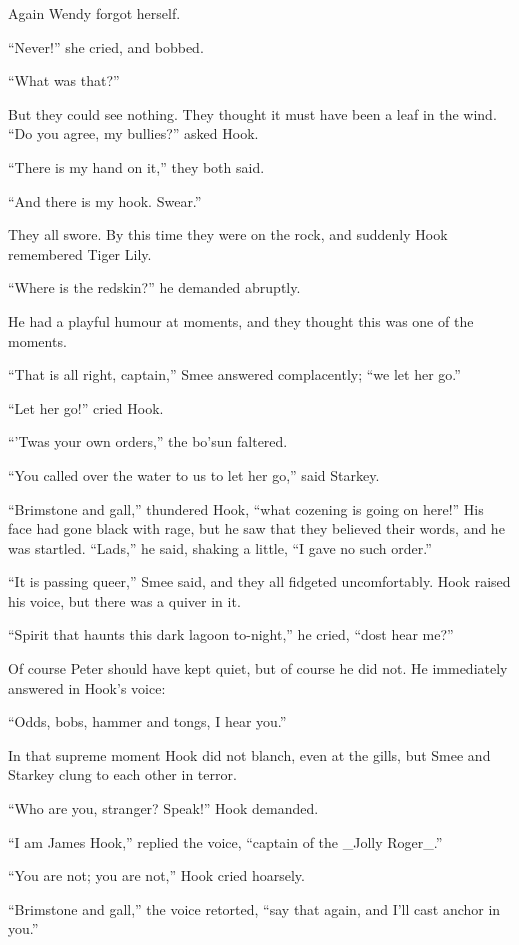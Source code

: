 Again Wendy forgot herself.

``Never!'' she cried, and bobbed.

``What was that?''

But they could see nothing. They thought it must have been a leaf in
the wind. ``Do you agree, my bullies?'' asked Hook.

``There is my hand on it,'' they both said.

``And there is my hook. Swear.''

They all swore. By this time they were on the rock, and suddenly Hook
remembered Tiger Lily.

``Where is the redskin?'' he demanded abruptly.

He had a playful humour at moments, and they thought this was one of
the moments.

``That is all right, captain,'' Smee answered complacently; ``we let her
go.''

``Let her go!'' cried Hook.

``'Twas your own orders,'' the bo'sun faltered.

``You called over the water to us to let her go,'' said Starkey.

``Brimstone and gall,'' thundered Hook, ``what cozening is going on here!''
His face had gone black with rage, but he saw that they believed their
words, and he was startled. ``Lads,'' he said, shaking a little, ``I gave
no such order.''

``It is passing queer,'' Smee said, and they all fidgeted uncomfortably.
Hook raised his voice, but there was a quiver in it.

``Spirit that haunts this dark lagoon to-night,'' he cried, ``dost hear
me?''

Of course Peter should have kept quiet, but of course he did not. He
immediately answered in Hook's voice:

``Odds, bobs, hammer and tongs, I hear you.''

In that supreme moment Hook did not blanch, even at the gills, but Smee
and Starkey clung to each other in terror.

``Who are you, stranger? Speak!'' Hook demanded.

``I am James Hook,'' replied the voice, ``captain of the _Jolly Roger_.''

``You are not; you are not,'' Hook cried hoarsely.

``Brimstone and gall,'' the voice retorted, ``say that again, and I'll
cast anchor in you.''

